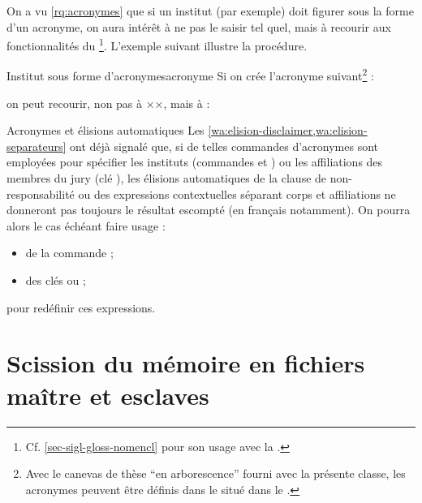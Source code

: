 On a vu \vref{rq:acronymes} que si un institut (par exemple) doit figurer
sous la forme d'un acronyme, on aura intérêt à ne pas le saisir tel
quel, mais à recourir aux fonctionnalités du
\footnote{Cf. \vref{sec-sigl-gloss-nomencl} pour
  son usage avec la \yatcl.}. L'exemple suivant illustre la
procédure.
%
\begin{dbexample}{Institut sous forme d'acronymes}{acronyme}
  Si on crée l'acronyme suivant\footnote{Avec le canevas de thèse \enquote{en
      arborescence} fourni avec la présente classe, les acronymes peuvent être
    définis dans le \File{\acronymsfile} situé dans le
    \Directory{\auxiliarydirectory}.} :
\begin{preamblecode}
\end{preamblecode}
on peut recourir, non pas à ××, mais à :
\begin{preamblecode}
\end{preamblecode}
\end{dbexample}

\begin{dbremark}{Acronymes et élisions automatiques}{}
  Les \vref{wa:elision-disclaimer,wa:elision-separateurs} ont déjà signalé que,
  si de telles commandes d'acronymes sont employées pour spécifier les
  instituts (commandes  et ) ou les
  affiliations des membres du jury (clé ), les élisions
  automatiques de la clause de non-responsabilité ou des expressions
  contextuelles séparant corps et affiliations ne donneront pas toujours
  le résultat escompté (en français notamment). On pourra alors le cas échéant
  faire usage :
  \begin{itemize}
  \item de la commande  ;
  \item des clés  ou  ;
  \end{itemize}
  pour redéfinir ces expressions.
\end{dbremark}

\section{Scission du mémoire en fichiers maître et esclaves}
\label{sec-repart-du-memo}

